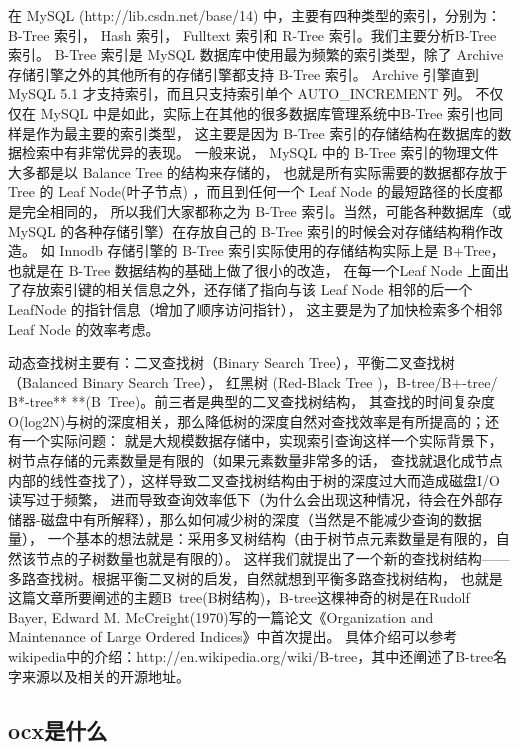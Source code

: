 \documentclass{book}
\begin{document}
在 MySQL (http://lib.csdn.net/base/14) 中，主要有四种类型的索引，分别为： B-Tree 索引， 
Hash 索引， Fulltext 索引和 R-Tree 索引。我们主要分析B-Tree 索引。
B-Tree 索引是 MySQL 数据库中使用最为频繁的索引类型，除了 Archive 存储引擎之外的其他所有的存储引擎都支持 B-Tree 索引。
Archive 引擎直到 MySQL 5.1 才支持索引，而且只支持索引单个 AUTO\_INCREMENT 列。
不仅仅在 MySQL 中是如此，实际上在其他的很多数据库管理系统中B-Tree 索引也同样是作为最主要的索引类型，
这主要是因为 B-Tree 索引的存储结构在数据库的数据检索中有非常优异的表现。
一般来说， MySQL 中的 B-Tree 索引的物理文件大多都是以 Balance Tree 的结构来存储的，
也就是所有实际需要的数据都存放于 Tree 的 Leaf Node(叶子节点) ，而且到任何一个 Leaf Node 的最短路径的长度都是完全相同的，
所以我们大家都称之为 B-Tree 索引。当然，可能各种数据库（或 MySQL 的各种存储引擎）在存放自己的 B-Tree 索引的时候会对存储结构稍作改造。
如 Innodb 存储引擎的 B-Tree 索引实际使用的存储结构实际上是 B+Tree，也就是在 B-Tree 数据结构的基础上做了很小的改造，
在每一个Leaf Node 上面出了存放索引键的相关信息之外，还存储了指向与该 Leaf Node 相邻的后一个 LeafNode 的指针信息（增加了顺序访问指针），
这主要是为了加快检索多个相邻 Leaf Node 的效率考虑。



动态查找树主要有：二叉查找树（Binary Search Tree），平衡二叉查找树（Balanced Binary Search Tree），
红黑树 (Red-Black Tree )，B-tree/B+-tree/ B*-tree** **(B~Tree)。前三者是典型的二叉查找树结构，
其查找的时间复杂度O(log2N)与树的深度相关，那么降低树的深度自然对查找效率是有所提高的；还有一个实际问题：
就是大规模数据存储中，实现索引查询这样一个实际背景下，树节点存储的元素数量是有限的（如果元素数量非常多的话，
查找就退化成节点内部的线性查找了），这样导致二叉查找树结构由于树的深度过大而造成磁盘I/O读写过于频繁，
进而导致查询效率低下（为什么会出现这种情况，待会在外部存储器-磁盘中有所解释），那么如何减少树的深度（当然是不能减少查询的数据量），
一个基本的想法就是：采用多叉树结构（由于树节点元素数量是有限的，自然该节点的子树数量也就是有限的）。
这样我们就提出了一个新的查找树结构——多路查找树。根据平衡二叉树的启发，自然就想到平衡多路查找树结构，
也就是这篇文章所要阐述的主题B~tree(B树结构)，B-tree这棵神奇的树是在Rudolf Bayer, 
Edward M. McCreight(1970)写的一篇论文《Organization and Maintenance of Large Ordered Indices》中首次提出。
具体介绍可以参考wikipedia中的介绍：http://en.wikipedia.org/wiki/B-tree，其中还阐述了B-tree名字来源以及相关的开源地址。

\subsection{ocx是什么}
\end{document}

